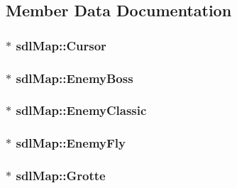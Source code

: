 \subsection{Member Data Documentation}
\hypertarget{structsdl_map_a236dd04a2df7f7f7206f8021efef2569}{
\subsubsection[{Cursor}]{$\ast$ sdl\-Map\-::\-Cursor}}\label{structsdl_map_a236dd04a2df7f7f7206f8021efef2569}
\hypertarget{structsdl_map_ac1a797b044af2a0f43862dc77973a668}{
\subsubsection[{Enemy\-Boss}]{$\ast$ sdl\-Map\-::\-Enemy\-Boss}}\label{structsdl_map_ac1a797b044af2a0f43862dc77973a668}
\hypertarget{structsdl_map_a5dc535d0f63b57bbcc90a0b97ba78717}{
\subsubsection[{Enemy\-Classic}]{$\ast$ sdl\-Map\-::\-Enemy\-Classic}}\label{structsdl_map_a5dc535d0f63b57bbcc90a0b97ba78717}
\hypertarget{structsdl_map_a894d4ebdb480c9e9fe57ad0cf0ed02f2}{
\subsubsection[{Enemy\-Fly}]{$\ast$ sdl\-Map\-::\-Enemy\-Fly}}\label{structsdl_map_a894d4ebdb480c9e9fe57ad0cf0ed02f2}
\hypertarget{structsdl_map_ace0a514e63e0cfefd14580b551fb36cd}{
\subsubsection[{Grotte}]{$\ast$ sdl\-Map\-::\-Grotte}}\label{structsdl_map_ace0a514e63e0cfefd14580b551fb36cd}
